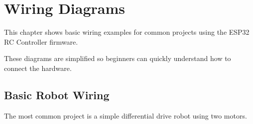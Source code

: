 \chapter{Wiring Diagrams}

This chapter shows basic wiring examples for common projects using the ESP32 RC Controller firmware.

These diagrams are simplified so beginners can quickly understand how to connect the hardware.

\section{Basic Robot Wiring}

The most common project is a simple differential drive robot using two motors.


